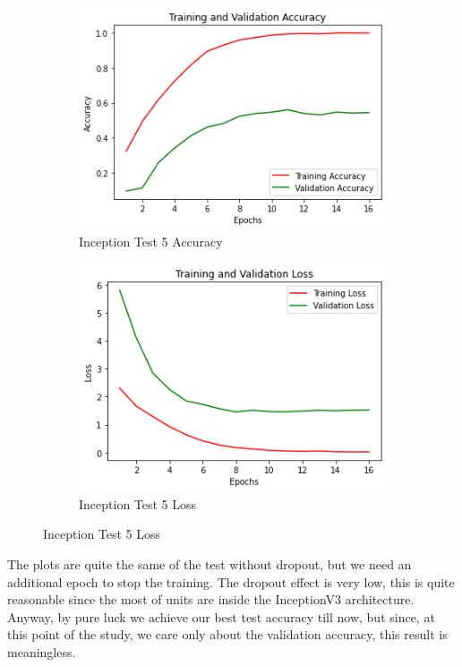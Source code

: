 \begin{figure}[H]
	\begin{subfigure}{0.5\textwidth}
		\includegraphics[width=0.9\linewidth]{img/inception/inceptionft3dropacc.png} 
		\caption{Inception Test 5 Accuracy}
		\label{fig:inceptionft3dropacc}
	\end{subfigure}
	\begin{subfigure}{0.5\textwidth}
		\includegraphics[width=0.9\linewidth]{img/inception/inceptionft3droploss.png}
		\caption{Inception Test 5 Loss}
		\label{fig:inceptionft3droploss}
	\end{subfigure}
\end{figure}

The plots are quite the same of the test without dropout, but we need an additional epoch to stop the training. The dropout effect is very low, this is quite reasonable since the most of units are inside the InceptionV3 architecture. Anyway, by pure luck we achieve our best test accuracy till now, but since, at this point of the study, we care only about the validation accuracy, this result is meaningless.


